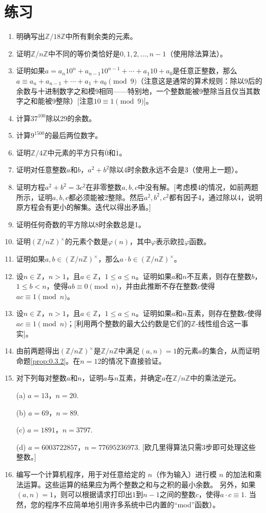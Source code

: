 \section*{练习}
\begin{enumerate}
\item 明确写出$\mathbb{Z}/18\mathbb{Z}$中所有剩余类的元素。
\item 证明$\mathbb{Z}/n\mathbb{Z}$中不同的等价类恰好是$0, 1, 2, \ldots, n-1$（使用除法算法）。
\item 证明如果$a = a_n 10^n + a_{n-1}10^{n-1} + \cdots + a_1 10 + a_0$是任意正整数，那么$a \equiv a_n + a_{n-1} + \cdots + a_1 + a_0 \pmod{9}$（注意这是通常的算术规则：除以9后的余数与十进制数字之和模9相同——特别地，一个整数能被9整除当且仅当其数字之和能被9整除）[注意$10 \equiv 1 \pmod{9}$]。
\item 计算$37^{100}$除以29的余数。
\item 计算$9^{1500}$的最后两位数字。
\item 证明$\mathbb{Z}/4\mathbb{Z}$中元素的平方只有$\overline{0}$和$\overline{1}$。
\item 证明对任意整数$a$和$b$，$a^2 + b^2$除以4时余数永远不会是3（使用上一题）。
\item 证明方程$a^2 + b^2 = 3c^2$在非零整数$a, b, c$中没有解。[考虑模4的情况，如前两题所示，证明$a, b, c$都必须能被2整除。然后$a^2, b^2, c^2$都有因子4，通过除以4，说明原方程会有更小的解集。迭代以得出矛盾。]
\item 证明任何奇数的平方除以8时余数总是1。
\item 证明$(\mathbb{Z}/n\mathbb{Z})^\times$的元素个数是$\varphi(n)$，其中$\varphi$表示欧拉$\varphi$函数。
\item 证明如果$a, b \in (\mathbb{Z}/n\mathbb{Z})^\times$，那么$a \cdot b \in (\mathbb{Z}/n\mathbb{Z})^\times$。
\item 设$n \in \mathbb{Z}$，$n > 1$，且$a \in \mathbb{Z}$，$1 \leq a \leq n$。证明如果$a$和$n$不互素，则存在整数$b$，$1 \leq b < n$，使得$ab \equiv 0 \pmod{n}$，并由此推断不存在整数$c$使得$ac \equiv 1 \pmod{n}$。
\item 设$n \in \mathbb{Z}$，$n > 1$，且$a \in \mathbb{Z}$，$1 \leq a \leq n$。证明如果$a$和$n$互素，则存在整数$c$使得$ac \equiv 1 \pmod{n}$；[利用两个整数的最大公约数是它们的$\mathbb{Z}$-线性组合这一事实]。
\item 由前两题得出$(\mathbb{Z}/n\mathbb{Z})^\times$是$\mathbb{Z}/n\mathbb{Z}$中满足$(a, n) = 1$的元素$a$的集合，从而证明命题\ref{prop:0.3.2}。在$n = 12$的情况下直接验证。
\item 对下列每对整数$a$和$n$，证明$a$与$n$互素，并确定$a$在$\mathbb{Z}/n\mathbb{Z}$中的乘法逆元。

(a) $a = 13$，$n = 20$.

(b) $a = 69$，$n = 89$.

(c) $a = 1891$，$n = 3797$.

(d) $a = 6003722857$，$n = 77695236973$. 
[欧几里得算法只需3步即可处理这些整数。]
\item 
编写一个计算机程序，用于对任意给定的 $n$（作为输入）进行模 $n$ 的加法和乘法运算。这些运算的结果应为两个整数之和与之积的最小余数。
另外，如果$(a, n) = 1$，则可以根据请求打印出$1$到$n-1$之间的整数$c$，使得$a \cdot c \equiv 1$. 
当然，您的程序不应简单地引用许多系统中已内置的“mod”函数）。
\end{enumerate}
